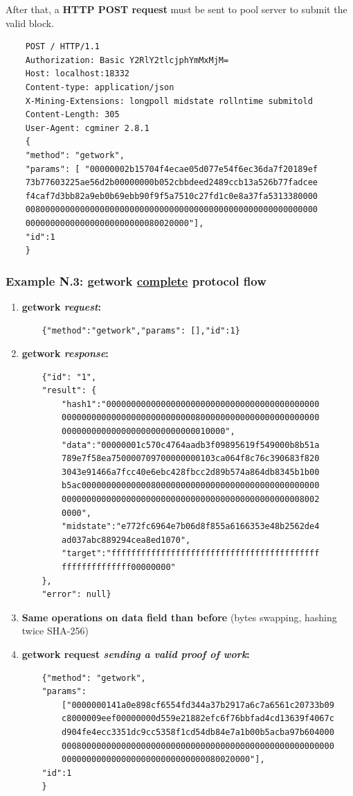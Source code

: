 After that, a \textbf{HTTP POST request} must be sent to pool server to submit the valid block.\\
\begin{verbatim}
    POST / HTTP/1.1
    Authorization: Basic Y2RlY2tlcjphYmMxMjM=
    Host: localhost:18332
    Content-type: application/json
    X-Mining-Extensions: longpoll midstate rollntime submitold
    Content-Length: 305
    User-Agent: cgminer 2.8.1
    {
    "method": "getwork", 
    "params": [ "00000002b15704f4ecae05d077e54f6ec36da7f20189ef
    73b77603225ae56d2b00000000b052cbbdeed2489ccb13a526b77fadcee
    f4caf7d3bb82a9eb0b69ebb90f9f5a7510c27fd1c0e8a37fa5313380000
    00800000000000000000000000000000000000000000000000000000000
    000000000000000000000000080020000"],
    "id":1
    }
\end{verbatim}
\newpage

\subsubsection{Example N.3: getwork \underline{complete} protocol flow}

\begin{enumerate}
    \item \textbf{getwork \textit{request}:}
    \begin{verbatim}
    {"method":"getwork","params": [],"id":1}
    \end{verbatim}
    \item \textbf{getwork \textit{response}:}
    \begin{verbatim}
    {"id": "1", 
    "result": {
        "hash1":"0000000000000000000000000000000000000000000
        0000000000000000000000000008000000000000000000000000
        000000000000000000000000000010000",
        "data":"00000001c570c4764aadb3f09895619f549000b8b51a
        789e7f58ea750000709700000000103ca064f8c76c390683f820
        3043e91466a7fcc40e6ebc428fbcc2d89b574a864db8345b1b00
        b5ac000000000000008000000000000000000000000000000000
        0000000000000000000000000000000000000000000000008002
        0000",
        "midstate":"e772fc6964e7b06d8f855a6166353e48b2562de4
        ad037abc889294cea8ed1070", 
        "target":"ffffffffffffffffffffffffffffffffffffffffff
        ffffffffffffff00000000"
    },
    "error": null}
    \end{verbatim}
    \item \textbf{Same operations on data field than before} (bytes swapping, hashing twice SHA-256)
        
    \item \textbf{getwork request \textit{sending a valid proof of work}:}
    \begin{verbatim}
    {"method": "getwork",
    "params":
        ["0000000141a0e898cf6554fd344a37b2917a6c7a6561c20733b09
        c8000009eef00000000d559e21882efc6f76bbfad4cd13639f4067c
        d904fe4ecc3351dc9cc5358f1cd54db84e7a1b00b5acba97b604000
        0008000000000000000000000000000000000000000000000000000
        00000000000000000000000000000080020000"],
    "id":1
    }    
    \end{verbatim}
    
\end{enumerate}